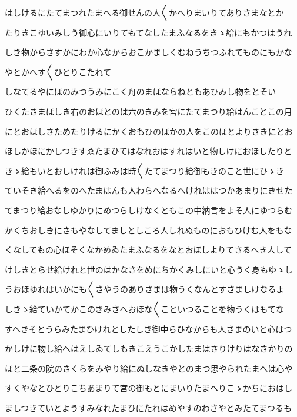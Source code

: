 \documentclass[a4paper,11pt,landscape]{ltjtarticle}
\begin{document}
\par\medskip
はしけるにたてまつれたまへる御せんの人〱かへりまいりてありさまなとか
\par\medskip
たりきこゆいみしう御心にいりてもてなしたまふなるをきゝ給にもかつはうれ
\par\medskip
しき物からさすかにわか心なからおこかましくむねうちつふれてものにもかな
\par\medskip
やとかへす〱ひとりこたれて
\par\medskip
しなてるやにほのみつうみにこく舟のまほならねともあひみし物をとそい
\par\medskip
ひくたさまほしき右のおほとのは六のきみを宮にたてまつり給はんことこの月
\par\medskip
にとおほしさためたりけるにかくおもひのほかの人をこのほとよりさきにとお
\par\medskip
ほしかほにかしつきすゑたまひてはなれおはすれはいと物しけにおほしたりと
\par\medskip
きゝ給もいとおしけれは御ふみは時〱たてまつり給御もきのこと世にひゝき
\par\medskip
ていそき給へるをのへたまはんも人わらへなるへけれははつかあまりにきせた
\par\medskip
てまつり給おなしゆかりにめつらしけなくともこの中納言をよそ人にゆつらむ
\par\medskip
かくちおしきにさもやなしてましとしころ人しれぬものにおもひけむ人をもな
\par\medskip
くなしてもの心ほそくなかめゐたまふなるをなとおほしよりてさるへき人して
\par\medskip
けしきとらせ給けれと世のはかなさをめにちかくみしにいと心うく身もゆゝし
\par\medskip
うおほゆれはいかにも〱さやうのありさまは物うくなんとすさましけなるよ
\par\medskip
しきゝ給ていかてかこのきみさへおほな〱こといつることを物うくはもてな
\par\medskip
すへきそとうらみたまひけれとしたしき御中らひなからも人さまのいと心はつ
\par\medskip
かしけに物し給へはえしゐてしもきこえうこかしたまはさりけりはなさかりの
\par\medskip
ほと二条の院のさくらをみやり給にぬしなきやとのまつ思やられたまへは心や
\par\medskip
すくやなとひとりこちあまりて宮の御もとにまいりたまへりこゝかちにおはし
\par\medskip
ましつきていとようすみなれたまひにたれはめやすのわさやとみたてまつるも
\par\medskip
\end{document}
